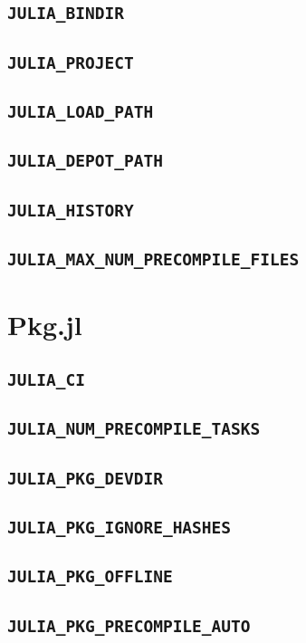     \subsection{\texttt{JULIA\_BINDIR}}
    \subsection{\texttt{JULIA\_PROJECT}}
    \subsection{\texttt{JULIA\_LOAD\_PATH}}
    \subsection{\texttt{JULIA\_DEPOT\_PATH}}
    \subsection{\texttt{JULIA\_HISTORY}}
    \subsection{\texttt{JULIA\_MAX\_NUM\_PRECOMPILE\_FILES}}
    \section{Pkg.jl}
    \subsection{\texttt{JULIA\_CI}}
    \subsection{\texttt{JULIA\_NUM\_PRECOMPILE\_TASKS}}
    \subsection{\texttt{JULIA\_PKG\_DEVDIR}}
    \subsection{\texttt{JULIA\_PKG\_IGNORE\_HASHES}}
    \subsection{\texttt{JULIA\_PKG\_OFFLINE}}
    \subsection{\texttt{JULIA\_PKG\_PRECOMPILE\_AUTO}}
